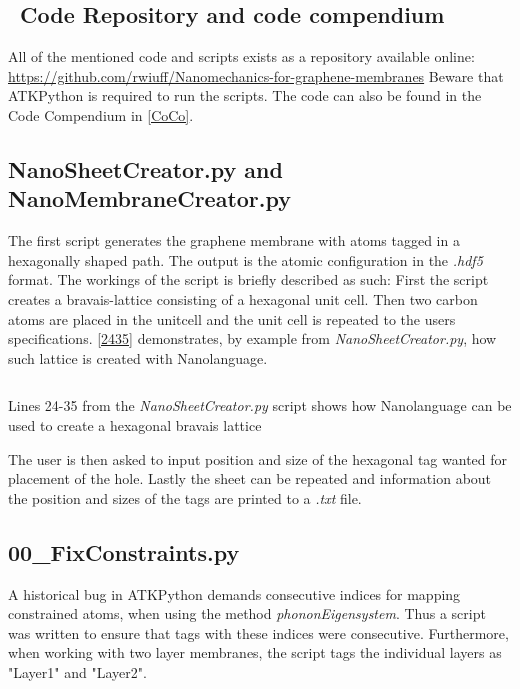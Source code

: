 \subsection{\faGithub \ Code Repository and code compendium}
All of the mentioned code and scripts exists as a repository available online:\newline
\url{https://github.com/rwiuff/Nanomechanics-for-graphene-membranes}
Beware that ATKPython\cite{QuantumWise} is required to run the scripts.
The code can also be found in the Code Compendium in \cref{CoCo}.
\subsection{NanoSheetCreator.py and NanoMembraneCreator.py}\label{NSCS}
The first script generates the graphene membrane with atoms tagged in a hexagonally shaped path. The output is the atomic configuration in the \textit{.hdf5} format.
The workings of the script is briefly described as such:
First the script creates a bravais-lattice consisting of a hexagonal unit cell. Then two carbon atoms are placed in the unitcell and the unit cell is repeated to the users specifications. \cref{2435} demonstrates, by example from \textit{NanoSheetCreator.py}, how such lattice is created with Nanolanguage.
\onecolumngrid

\begin{listing}[H]
 \inputminted[python3=true,bgcolor=Black,linenos=true,firstline=24,lastline=35]{python}{Listings/NanoSheetCreator.py}
 \caption{Lines 24-35 from the \textit{NanoSheetCreator.py} script shows how Nanolanguage can be used to create a hexagonal bravais lattice}
 \label{2435}
\end{listing}
\twocolumngrid
The user is then asked to input position and size of the hexagonal tag wanted for placement of the hole. Lastly the sheet can be repeated and information about the position and sizes of the tags are printed to a \textit{.txt} file.
\subsection{00\_FixConstraints.py}\label{00}
A historical bug in ATKPython demands consecutive indices for mapping constrained atoms, when using the method \textit{phononEigensystem}. Thus a script was written to ensure that tags with these indices were consecutive. Furthermore, when working with two layer membranes, the script tags the individual layers as "Layer1" and "Layer2".
\onecolumngrid

